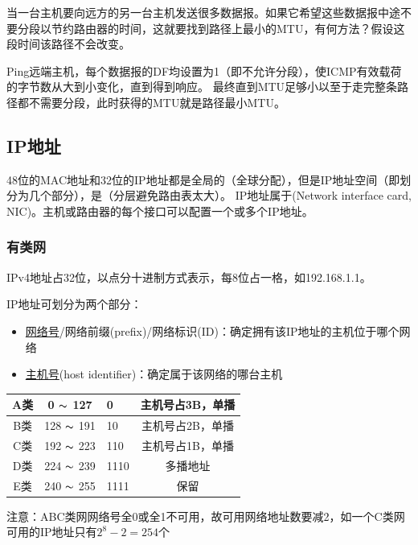 \begin{example}
	当一台主机要向远方的另一台主机发送很多数据报。如果它希望这些数据报中途不要分段以节约路由器的时间，这就要找到路径上最小的MTU，有何方法？假设这段时间该路径不会改变。
\end{example}
\begin{analysis}
	Ping远端主机，每个数据报的DF均设置为1（即不允许分段），使ICMP有效载荷的字节数从大到小变化，直到得到响应。
	最终直到MTU足够小以至于走完整条路径都不需要分段，此时获得的MTU就是路径最小MTU。
\end{analysis}

\subsection{IP地址}
48位的MAC地址和32位的IP地址都是全局的（全球分配），但是IP地址空间（即划分为几个部分），是（分层避免路由表太大）。
IP地址属于(Network interface card, NIC)。主机或路由器的每个接口可以配置一个或多个IP地址。

\subsubsection{有类网}
IPv4地址占32位，以点分十进制方式表示，每8位占一格，如192.168.1.1。

IP地址可划分为两个部分：
\begin{itemize}
	\item \underline{网络号}/网络前缀(prefix)/网络标识(ID)：确定拥有该IP地址的主机位于哪个网络
	\item \underline{主机号}(host identifier)：确定属于该网络的哪台主机
\end{itemize}

\begin{center}
\begin{tabular}{|c|c|l|c|}\hline
A类 & 0 $\thicksim$ 127 & 0 & 主机号占3B，单播\\\hline
B类 & 128 $\thicksim$ 191 & 10 & 主机号占2B，单播\\\hline
C类 & 192 $\thicksim$ 223 & 110 & 主机号占1B，单播\\\hline
D类 & 224 $\thicksim$ 239 & 1110 & 多播地址\\\hline
E类 & 240 $\thicksim$ 255 & 1111 & 保留\\\hline
\end{tabular}
\end{center}
注意：ABC类网网络号全0或全1不可用，故可用网络地址数要减2，如一个C类网可用的IP地址只有$2^8-2=254$个

